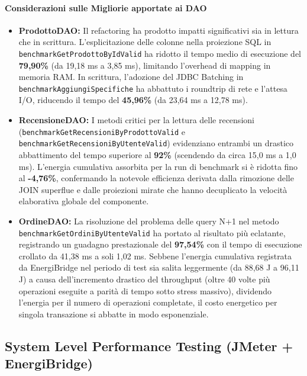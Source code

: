 \paragraph{Considerazioni sulle Migliorie apportate ai DAO}
\begin{itemize}
    \item \textbf{ProdottoDAO:} Il refactoring ha prodotto impatti significativi sia in lettura che in scrittura. L'esplicitazione delle colonne nella proiezione SQL in \texttt{benchmarkGetProdottoByIdValid} ha ridotto il tempo medio di esecuzione del \textbf{79,90\%} (da 19,18 ms a 3,85 ms), limitando l'overhead di mapping in memoria RAM. In scrittura, l'adozione del JDBC Batching in \texttt{benchmarkAggiungiSpecifiche} ha abbattuto i roundtrip di rete e l'attesa I/O, riducendo il tempo del \textbf{45,96\%} (da 23,64 ms a 12,78 ms).
    \item \textbf{RecensioneDAO:} I metodi critici per la lettura delle recensioni (\texttt{benchmarkGetRecensioniByProdottoValid} e \texttt{benchmarkGetRecensioniByUtenteValid}) evidenziano entrambi un drastico abbattimento del tempo superiore al \textbf{92\%} (scendendo da circa 15,0 ms a 1,0 ms). L'energia cumulativa assorbita per la run di benchmark si è ridotta fino al \textbf{-4,76\%}, confermando la notevole efficienza derivata dalla rimozione delle JOIN superflue e dalle proiezioni mirate che hanno decuplicato la velocità elaborativa globale del componente.
    \item \textbf{OrdineDAO:} La risoluzione del problema delle query N+1 nel metodo \texttt{benchmarkGetOrdiniByUtenteValid} ha portato al risultato più eclatante, registrando un guadagno prestazionale del \textbf{97,54\%} con il tempo di esecuzione crollato da 41,38 ms a soli 1,02 ms. Sebbene l'energia cumulativa registrata da EnergiBridge nel periodo di test sia salita leggermente (da 88,68 J a 96,11 J) a causa dell'incremento drastico del throughput (oltre 40 volte più operazioni eseguite a parità di tempo sotto stress massivo), dividendo l'energia per il numero di operazioni completate, il costo energetico per singola transazione si abbatte in modo esponenziale.
\end{itemize}

\subsection{System Level Performance Testing (JMeter + EnergiBridge)}

